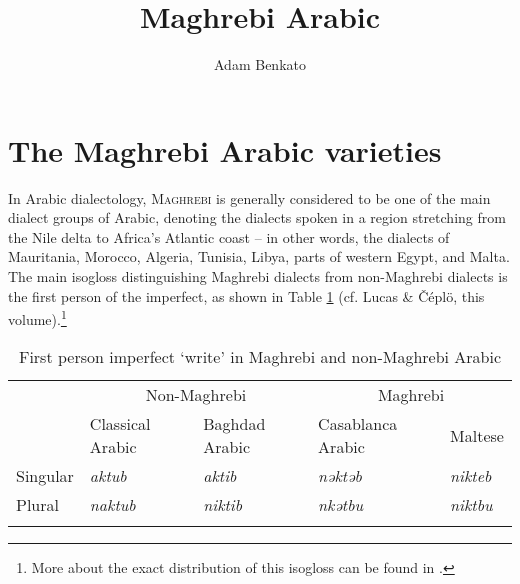 \documentclass[output=paper]{langsci/langscibook}
\author{Adam Benkato\affiliation{University of California, Berkeley}}
\title{Maghrebi Arabic}
\begin{document}
  
\section{The Maghrebi Arabic varieties}

In Arabic dialectology, \textsc{Maghrebi} is generally considered to be one of the main dialect groups of Arabic, denoting the dialects spoken in a region stretching from the Nile delta to Africa’s Atlantic coast -- in other words, the dialects of Mauritania, Morocco, Algeria, Tunisia, Libya, parts of western Egypt, and Malta. The main isogloss distinguishing Maghrebi dialects from non-Maghrebi dialects is the first person of the imperfect, as shown in Table \ref{tab:1:niktib} (cf. Lucas \& Čéplö, this volume).\footnote{More about the exact distribution of this isogloss can be found in \citet{Behnstedt2016niktib}.}


\begin{table}
\caption{First person imperfect `write' in Maghrebi and non-Maghrebi Arabic}
\label{tab:1:niktib}
 \begin{tabular}{lllll} 
  \lsptoprule
         & \multicolumn{2}{c}{Non-Maghrebi}       & \multicolumn{2}{c}{Maghrebi} \\
         & Classical Arabic & Baghdad Arabic & Casablanca Arabic & Maltese \\
           \midrule
Singular & \textit{aktub}            & \textit{aktib}          & \textit{nəktəb}            & \textit{nikteb}  \\
Plural   & \textit{naktub}           & \textit{niktib}         & \textit{nkətbu}            & \textit{niktbu}  \\
\lspbottomrule
\end{tabular}
\end{table}
\end{document}
